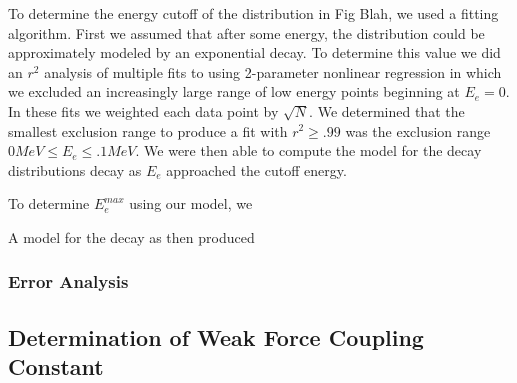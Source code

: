 To determine the energy cutoff of the distribution in Fig Blah, we used a fitting algorithm.  First we assumed that after some energy, the distribution could be approximately modeled by an exponential decay.  To determine this value we did an $r^{2}$ analysis of multiple fits to using 2-parameter nonlinear regression in which we excluded an increasingly large range of low energy points beginning at $E_{e}=0$.  In these fits we weighted each data point by $\sqrt{N}$.  We determined that the smallest exclusion range to produce a fit with $r^{2}\geq.99$ was the exclusion range $0 MeV \leq E_{e}\leq .1 MeV$.  We were then able to compute the model for the decay distributions decay as $E_{e}$ approached the cutoff energy.

To determine $E_{e}^{max}$ using our model, we 

A model for the decay as then produced


\subsubsection{Error Analysis}

\subsection{Determination of Weak Force Coupling Constant}

